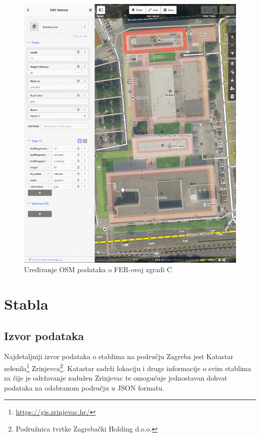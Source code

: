 \documentclass[times, utf8, zavrsni, numeric]{fer}
\begin{document}
		\begin{figure}[h]
			\includegraphics[width=14cm]{figures/OSM_edit_C_building.png}
			\centering
			\caption{Uređivanje OSM podataka o FER-ovoj zgradi C}
			\label{fig:OSM_edit_C_building}
		\end{figure}



\chapter{Stabla}
	
	\section{Izvor podataka}
	
		Najdetaljniji izvor podataka o stablima na području Zagreba jest Katastar zelenila\footnote{\url{https://gis.zrinjevac.hr/}} Zrinjevca\footnote{Podružnica tvrtke Zagrebački Holding d.o.o.}.
		Katastar sadrži lokaciju i druge informacije o svim stablima za čije je održavanje zadužen Zrinjevac te omogućuje jednostavan dohvat podataka na odabranom području u JSON formatu.
		
\end{document}
